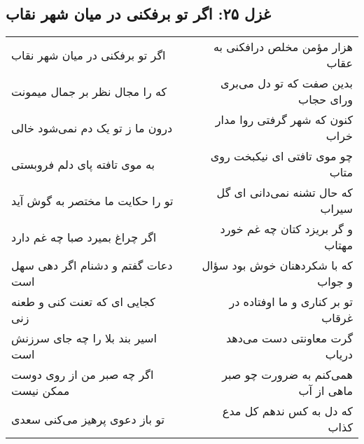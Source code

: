 \begin{center}
\section*{غزل ۲۵: اگر تو برفکنی در میان شهر نقاب}
\label{sec:025}
\begin{longtable}{l p{0.5cm} r}
اگر تو برفکنی در میان شهر نقاب
&&
هزار مؤمن مخلص درافکنی به عقاب
\\
که را مجال نظر بر جمال میمونت
&&
بدین صفت که تو دل می‌بری ورای حجاب
\\
درون ما ز تو یک دم نمی‌شود خالی
&&
کنون که شهر گرفتی روا مدار خراب
\\
به موی تافته پای دلم فروبستی
&&
چو موی تافتی ای نیکبخت روی متاب
\\
تو را حکایت ما مختصر به گوش آید
&&
که حال تشنه نمی‌دانی ای گل سیراب
\\
اگر چراغ بمیرد صبا چه غم دارد
&&
و گر بریزد کتان چه غم خورد مهتاب
\\
دعات گفتم و دشنام اگر دهی سهل است
&&
که با شکردهنان خوش بود سؤال و جواب
\\
کجایی ای که تعنت کنی و طعنه زنی
&&
تو بر کناری و ما اوفتاده در غرقاب
\\
اسیر بند بلا را چه جای سرزنش است
&&
گرت معاونتی دست می‌دهد دریاب
\\
اگر چه صبر من از روی دوست ممکن نیست
&&
همی‌کنم به ضرورت چو صبر ماهی از آب
\\
تو باز دعوی پرهیز می‌کنی سعدی
&&
که دل به کس ندهم کل مدع کذاب
\\
\end{longtable}
\end{center}
